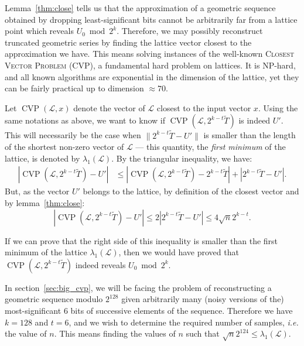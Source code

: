 \documentclass[journal=tosc,final]{iacrtrans}
\DeclareMathOperator{\CVP}{CVP}
\begin{document}
Lemma~\ref{thm:close} tells us that the approximation of a geometric sequence
obtained by dropping least-significant bits cannot be arbitrarily far from a
lattice point which reveals $U_0 \bmod 2^k$. Therefore, we may possibly
reconstruct truncated geometric series by finding the lattice vector closest to
the approximation we have. This means solving instances of the well-known
\textsc{Closest Vector Problem} (CVP), a fundamental hard problem on
lattices. It is NP-hard, and all known algorithms are exponential in the
dimension of the lattice, yet they can be fairly practical up to dimension
$\approx 70$.

Let $\CVP(\mathcal{L}, x)$ denote the vector of $\mathcal{L}$ closest to the
input vector $x$. Using the same notations as above, we want to know if
$\CVP\left(\mathcal{L}, 2^{k-t}\widetilde{T}\right)$ is indeed $U'$. This
will necessarily be the case when $\|2^{k-t}\widetilde{T} - U'\|$ is smaller
than the length of the shortest non-zero vector of $\mathcal{L}$ --- this quantity,
the \emph{first minimum} of the lattice, is denoted by $\lambda_1(\mathcal{L})$.
By the triangular inequality, we have:
\begin{align*}
|\CVP(\mathcal{L}, 2^{k-t}\widetilde{T}) - U'| %
                             & \leq \left| \CVP\left(\mathcal{L}, 2^{k-t}\widetilde{T} \right) - 2^{k-t}\widetilde{T}\right | + \left|2^{k-t}\widetilde{T} - U'\right|.
\end{align*}
But, as the vector $U'$ belongs to the lattice, by definition of the closest
vector and by lemma~\ref{thm:close}:
\[
  |\CVP(\mathcal{L}, 2^{k-t}\widetilde{T}) - U'| \leq 2 \left|2^{k-t} \widetilde{T} - U' \right| \leq 4 \sqrt{n} 2^{k-t}.
\]

If we can prove that the right side of this inequality is smaller than the first
minimum of the lattice $\lambda_1(\mathcal{L})$, then we would have proved that
$\CVP(\mathcal{L}, 2^{k-t}\widetilde{T})$ indeed reveals $U_0 \bmod 2^k$.

In section~\ref{sec:big_cvp}, we will be facing the problem of reconstructing a
geometric sequence modulo $2^{128}$ given arbitrarily many (noisy versions of
the) most-significant $6$ bits of successive elements of the sequence. Therefore
we have $k=128$ and $t=6$, and we wish to determine the required number of
samples, \textit{i.e.} the value of $n$. This means finding the values of $n$
such that $\sqrt{n} 2^{124} \leq \lambda_1\left(\mathcal{L}\right)$.
\end{document}
